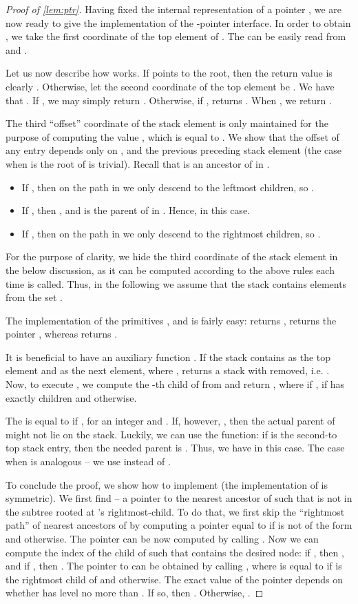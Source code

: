 \documentclass[a4paper]{article}
\theoremstyle{remark}
\begin{document}
\begin{proof}[Proof of \cref{lem:ptr}]
Having fixed the internal representation of a pointer , we are
now ready to give the implementation of the -pointer interface.
In order to obtain , we take the first coordinate of the top element of .
The  can be easily read from  and .

Let us now describe how  works.
If  points to the root, then the return value is clearly .
Otherwise, let the second coordinate of the top element be .
We have that .
If , we may simply return .
Otherwise, if ,  returns .
When , we return .

The third ``offset'' coordinate of the stack element  is only
maintained for the purpose of computing the value , which
is equal to .
We show that the offset  of any entry depends
only on ,  and the previous preceding stack element 
(the case when  is the root of  is trivial).
Recall that  is an ancestor of  in .
\begin{itemize}
\item If , then on the path  in 
  we only descend to the leftmost children, so .
\item If , then ,  and
 is the parent of  in .
Hence,  in this case.
\item If , then on the path  in 
  we only descend to the rightmost children, so
  .
\end{itemize}
For the purpose of clarity, we hide the third coordinate of the stack element
in the below discussion, as it can be computed according to the above
rules each time  is called.
Thus, in the following we assume that the stack contains
elements from the set .

The implementation of the primitives ,  and 
is fairly easy:  returns ,
 returns the pointer
,
whereas  returns .

It is beneficial to have an auxiliary
function .
If the stack  contains  as the top element
and  as the next element, where ,
 returns a stack  with  removed, i.e.
.
Now, to execute , we compute the -th child  of 
from  and return ,
where  if ,  if  has exactly
 children and  otherwise.

The  is equal to  if ,
for an integer  and .
If, however, , then the actual parent
of  might not lie on the stack.
Luckily, we can use the  function: if  is the second-to top stack
entry, then the needed parent is .
Thus, we have 
in this case.
The case when  is analogous -- we use 
instead of .

To conclude the proof, we show how to implement  (the implementation
of  is symmetric).
We first find  -- a pointer to the nearest ancestor  of  such that  is not in
the subtree rooted at 's rightmost-child.
To do that, we first skip the ``rightmost path'' of nearest ancestors
of  by computing a pointer  equal to  if  is
not of the form  and  otherwise.
The pointer  can be now computed by calling .
Now we can compute the index  of the child  of  such that
 contains the desired node: if , then , and if , then .
The pointer  to  can be obtained by calling ,
where  is equal to  if  is the rightmost child
of  and  otherwise.
The exact value of the pointer  depends on whether
 has level no more than .
If so, then .
Otherwise, .


\end{proof}
\end{document}
